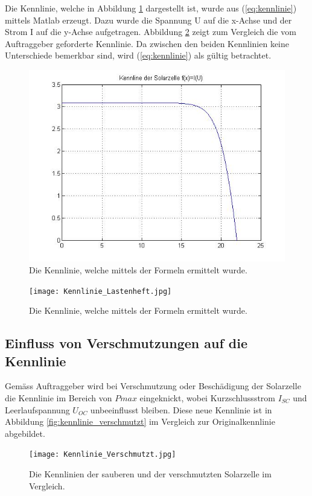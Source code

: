 Die Kennlinie, welche in Abbildung \ref{fig:Kennlinie} dargestellt ist, wurde aus (\ref{eq:kennlinie}) mittels Matlab erzeugt. Dazu wurde die Spannung U auf die x-Achse und der Strom I auf die y-Achse aufgetragen. Abbildung \ref{fig:Kennlinie_Lastenheft} zeigt zum Vergleich die vom Auftraggeber geforderte Kennlinie. Da zwischen den beiden Kennlinien keine Unterschiede bemerkbar sind, wird (\ref{eq:kennlinie}) als gültig betrachtet.
\begin{figure}
	\centering
		\includegraphics[width=1.0\textwidth]{Kennlinie.jpg}
	\caption{Die Kennlinie, welche mittels der Formeln ermittelt wurde.}
	\label{fig:Kennlinie}
\end{figure}
\begin{figure}
	\centering
		\texttt{[image: Kennlinie\_Lastenheft.jpg]}
	\caption{Die Kennlinie, welche mittels der Formeln ermittelt wurde.}
	\label{fig:Kennlinie_Lastenheft}
\end{figure}

\subsection{Einfluss von Verschmutzungen auf die Kennlinie}
Gemäss Auftraggeber wird bei Verschmutzung oder Beschädigung der Solarzelle die Kennlinie im Bereich von $Pmax$ eingeknickt, wobei Kurzschlussstrom $I_{SC}$ und Leerlaufspannung $U_{OC}$ unbeeinflusst bleiben. Diese neue Kennlinie ist in Abbildung \ref{fig:kennlinie_verschmutzt} im Vergleich zur Originalkennlinie abgebildet.
\begin{figure}
	\centering
		\texttt{[image: Kennlinie\_Verschmutzt.jpg]}
	\caption{Die Kennlinien der sauberen und der verschmutzten Solarzelle im Vergleich.}
	\label{fig:Kennlinie_Verschmutzt}
\end{figure}

